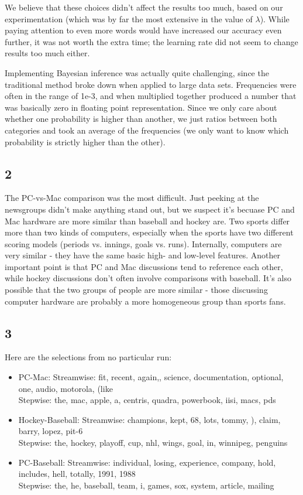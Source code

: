 \documentclass{article}
\begin{document}
  We believe that these choices didn't affect the results too much, based on our experimentation (which was by far the most extensive in the value of $\lambda$). While paying attention to even more words would have increased our accuracy even further, it was not worth the extra time; the learning rate did not seem to change results too much either.

  Implementing Bayesian inference was actually quite challenging, since the traditional method broke down when applied to large data sets. Frequencies were often in the range of 1e-3,
  and when multiplied together produced a number that was basically zero in floating point representation. Since we only care about whether one probability is higher than another, 
  we just ratios between both categories and took an average of the frequencies (we only want to know which probability is strictly higher than the other).

\subsection{2}
The PC-vs-Mac comparison was the most difficult. Just peeking at the newsgroups didn't make anything stand out, but we suspect it's becuase PC and Mac hardware are more similar than baseball and hockey are.
Two sports differ more than two kinds of computers, especially when the sports have two different scoring models (periods vs. innings, goals vs. runs).
Internally, computers are very similar - they have the same basic high- and low-level features.
Another important point is that PC and Mac discussions tend to reference each other, while hockey discussions don't often involve comparisons with baseball.
It's also possible that the two groups of people are more similar - those discussing computer hardware are probably a more homogeneous group than sports fans.

\subsection{3}
Here are the selections from no particular run:

\begin{itemize}
  \item PC-Mac: Streamwise: fit, recent, again,, science, documentation, optional, one, audio, motorola, (like\\
Stepwise: the, mac, apple, a, centris, quadra, powerbook, iisi, macs, pds

\item Hockey-Baseball: Streamwise: champions, kept, 68, lots, tommy, ), claim, barry, lopez, pit-6\\
Stepwise: the, hockey, playoff, cup, nhl, wings, goal, in, winnipeg, penguins

\item PC-Baseball: Streamwise: individual, losing, experience, company, hold, includes, hell, totally, 1991, 1988\\
Stepwise: the, he, baseball, team, i, games, sox, system, article, mailing
\end{itemize}
\end{document}
